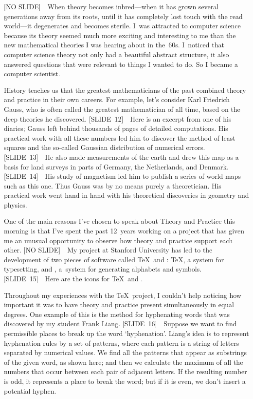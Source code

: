 [NO SLIDE]\ \ When theory becomes inbred---when it has grown several
generations away from its roots, until it has completely lost touch
with the read world---it degenerates and becomes sterile. I~was
attracted to computer science because its theory seemed much more
exciting and interesting to me than the new mathematical theories I
was hearing about in the~60s. I~noticed that computer science theory
not only had a beautiful abstract structure, it also answered
questions that were relevant to things I wanted to do. So I became a
computer scientist.

History teaches us that the greatest mathematicians of the past
combined theory and practice in their own careers. For example, let's
consider Karl Friedrich Gauss, who is often called the greatest
mathematician of all time, based on the deep theories he discovered.
[SLIDE~12]\ \ Here is an excerpt from one of his diaries; Gauss left
behind thousands of pages of detailed computations. His practical work
with all these numbers led him to discover the method of least squares
and the so-called Gaussian distribution of numerical errors.
[SLIDE~13]\ \ He also made measurements of the earth and drew this map
as a basis for land surveys in parts of Germany, the Netherlands, and
Denmark. [SLIDE~14]\ \ His study of magnetism led him to publish a
series of world maps such as this one. Thus Gauss was by no means
purely a theoretician. His practical work went hand in hand with his
theoretical discoveries in geometry and physics.

One of the main reasons I've chosen to speak about Theory and Practice
this morning is that I've spent the past 12~years working on a project
that 
has given me an unusual opportunity to observe how theory and practice
support each other. [NO SLIDE]\ \ My project at Stanford University has
led to the development of two pieces of software called \TeX\ and 
\MF\kern-1pt: \TeX, a system for typesetting, and \MF\kern-1pt,
a~system for generating alphabets and symbols. [SLIDE~15]\ \ Here are
the icons for \TeX\ and \MF\kern-1pt.


Throughout my experiences with the \TeX\ project, I couldn't help
noticing how important it was to have theory and practice present
simultaneously in equal degrees. One example of this is the method for
hyphenating words that was discovered by my student Frank Liang.
[SLIDE~16]\ \ Suppose we want to find permissible places to break up
the word `hyphenation'. Liang's idea is to represent hyphenation rules
by a set of patterns, where each pattern is a string of letters
separated by numerical values. We find all the patterns that appear as
substrings of the given word, as shown here; and then we calculate the
maximum of all the numbers that occur between each pair of adjacent
letters. If the resulting number is odd, it represents a place to
break the word; but if it is even, we don't insert a potential hyphen.

